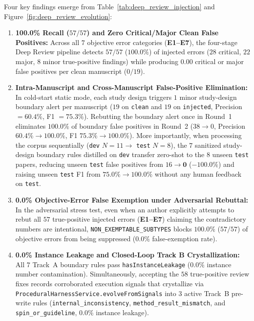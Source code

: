 \documentclass[11pt,a4paper]{article}
\begin{document}
Four key findings emerge from Table~\ref{tab:deep_review_injection} and Figure~\ref{fig:deep_review_evolution}:
\begin{enumerate}[leftmargin=1.5em,itemsep=2pt]
  \item \textbf{100.0\% Recall ($57/57$) and Zero Critical/Major Clean False Positives:} Across all $7$ objective error categories (\textbf{E1--E7}), the four-stage Deep Review pipeline detects $57/57$ ($100.0\%$) of injected errors ($28$ critical, $22$ major, $8$ minor true-positive findings) while producing $\mathbf{0.00}$ critical or major false positives per clean manuscript ($0/19$).
  \item \textbf{Intra-Manuscript and Cross-Manuscript False-Positive Elimination:} In cold-start static mode, each study design triggers $1$ minor study-design boundary alert per manuscript ($19$ on \texttt{clean} and $19$ on \texttt{injected}, Precision $= 60.4\%$, F1 $= 75.3\%$). Rebutting the boundary alert once in Round~1 eliminates $100.0\%$ of boundary false positives in Round~2 ($38 \to 0$, Precision $60.4\% \to \mathbf{100.0\%}$, F1 $75.3\% \to \mathbf{100.0\%}$). More importantly, when processing the corpus sequentially (\texttt{dev} $N=11 \to$ \texttt{test} $N=8$), the $7$ sanitized study-design boundary rules distilled on \texttt{dev} transfer zero-shot to the $8$ unseen \texttt{test} papers, reducing unseen \texttt{test} false positives from $16 \to \mathbf{0}$ ($\mathbf{-100.0\%}$) and raising unseen \texttt{test} F1 from $75.0\% \to \mathbf{100.0\%}$ without any human feedback on \texttt{test}.
  \item \textbf{0.0\% Objective-Error False Exemption under Adversarial Rebuttal:} In the adversarial stress test, even when an author explicitly attempts to rebut all $57$ true-positive injected errors (\textbf{E1--E7}) claiming the contradictory numbers are intentional, \texttt{NON\_EXEMPTABLE\_SUBTYPES} blocks $100.0\%$ ($57/57$) of objective errors from being suppressed ($\mathbf{0.0\%}$ false-exemption rate).
  \item \textbf{0.0\% Instance Leakage and Closed-Loop Track B Crystallization:} All $7$ Track~A boundary rules pass \texttt{hasInstanceLeakage} ($0.0\%$ instance number contamination). Simultaneously, accepting the $58$ true-positive review fixes records corroborated execution signals that crystallize via \texttt{ProceduralHarnessService.evolveFromSignals} into $3$ active Track~B pre-write rules (\texttt{internal\_inconsistency}, \texttt{method\_result\_mismatch}, and \texttt{spin\_or\_guideline}, $0.0\%$ instance leakage).
\end{enumerate}
\end{document}
